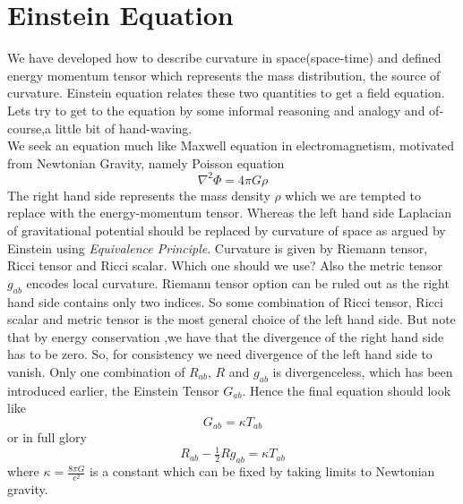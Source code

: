 \documentclass[a4paper]{report}
\theoremstyle{definition}
\theoremstyle{remark}
\begin{document}
	\section{Einstein Equation}
		We have developed how to describe curvature in space(space-time) and defined energy momentum tensor which represents the mass distribution, the source of curvature. Einstein equation relates these two quantities to get a field equation. Lets try to get to the equation by some informal reasoning and analogy and of-course,a little bit of hand-waving. \\ 
		We seek an equation much like Maxwell equation in electromagnetism, motivated from Newtonian Gravity, namely Poisson equation
		\begin{equation*}
			\nabla^2\Phi = 4\pi G\rho
		\end{equation*}
		The right hand side represents the mass density $\rho$ which we are tempted to replace with the energy-momentum tensor. Whereas the left hand side Laplacian of gravitational potential should be replaced by curvature of space as argued by Einstein using \emph{Equivalence Principle}. Curvature is given by Riemann tensor, Ricci tensor and Ricci scalar. Which one should we use? Also the metric tensor $g_{ab}$ encodes local curvature. Riemann tensor option can be ruled out as the right hand side contains only two indices. So some combination of Ricci tensor, Ricci scalar and metric tensor is the most general choice of the left hand side. But note that by energy conservation ,we have that the divergence of the right hand side has to be zero. So, for consistency we need divergence of the left hand side to vanish. Only one combination of $R_{ab}$, $R$ and $g_{ab}$ is divergenceless, which has been introduced earlier, the Einstein Tensor $G_{ab}$. Hence the final equation should look like
		\begin{equation*}
			G_{ab}  = \kappa T_{ab}
		\end{equation*} 
		or in full glory 
		\begin{equation*}
			R_{ab} - \tfrac{1}{2}Rg_{ab}  = \kappa T_{ab}
		\end{equation*} 
		where $\kappa = \tfrac{8\pi G}{c^2}$ is a constant which can be fixed by taking limits to Newtonian gravity. 
	
\end{document}
